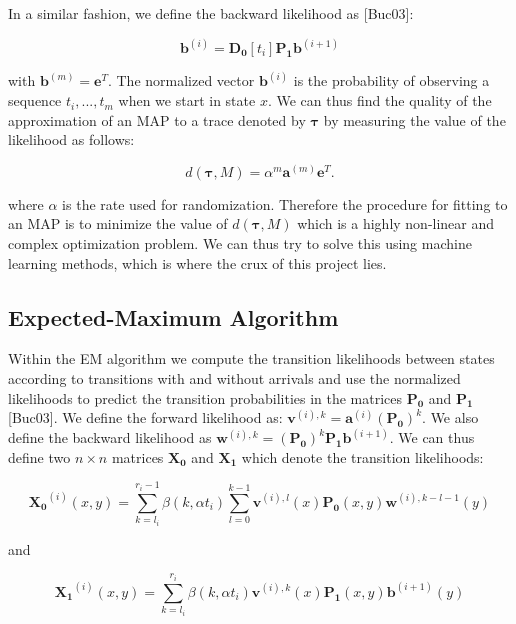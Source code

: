 \documentclass[a4paper,11pt,titlepage]{article}
\begin{document}
In a similar fashion, we define the backward likelihood as [Buc03]:

\begin{equation}
    \mathbf{b}^{(i)} = \mathbf{D_0}[t_i]\mathbf{P_1}\mathbf{b}^{(i+1)}
    \label{b_likelihood_equation}
\end{equation}

with $\mathbf{b}^{(m)} = \mathbf{e}^T$. The normalized vector $\mathbf{b}^{(i)}$ is the probability of observing a sequence $t_i,...,t_m$ when we start in state $x$. We can thus find the quality of the approximation of an MAP to a trace denoted by $\bm{\tau}$ by measuring the value of the likelihood as follows: 

\begin{equation}
    d(\bm{\tau},M) = \alpha^m \mathbf{a}^{(m)} \mathbf{e}^T.
\end{equation}

where $\alpha$ is the rate used for randomization. Therefore the procedure for fitting to an MAP is to minimize the value of $d(\bm{\tau},M)$ which is a highly non-linear and complex optimization problem. We can thus try to solve this using machine learning methods, which is where the crux of this project lies. 

\subsection{Expected-Maximum Algorithm}

Within the EM algorithm we compute the transition likelihoods between states according to transitions with and without arrivals and use the normalized likelihoods to predict the transition probabilities in the matrices $\mathbf{P_0}$ and $\mathbf{P_1}$ [Buc03]. We define the forward likelihood as: $\mathbf{v}^{(i),k} = \mathbf{a}^{(i)} (\mathbf{P_0})^k$. We also define the backward likelihood as $\mathbf{w}^{(i),k} = (\mathbf{P_0})^k \mathbf{P_1} \mathbf{b}^{(i+1)}$. We can thus define two $n \times n$ matrices $\mathbf{X_0}$ and $\mathbf{X_1}$ which denote the transition likelihoods:

\begin{equation}
    \mathbf{X_0}^{(i)} (x,y) = \sum_{k=l_i}^{r_i - 1} \beta (k, \alpha t_i) \sum_{l=0}^{k-1} \mathbf{v}^{(i),l} (x) \mathbf{P_0} (x,y) \mathbf{w}^{(i),k-l-1}(y)
    \label{eqn:X_0}
\end{equation}

and 

\begin{equation} 
    \mathbf{X_1}^{(i)}(x,y) = \sum_{k=l_i}^{r_i} \beta (k, \alpha t_i) \mathbf{v}^{(i),k} (x) \mathbf{P_1}(x,y) \mathbf{b}^{(i+1)}(y)
    \label{eqn:X_1}
\end{equation}
\end{document}

